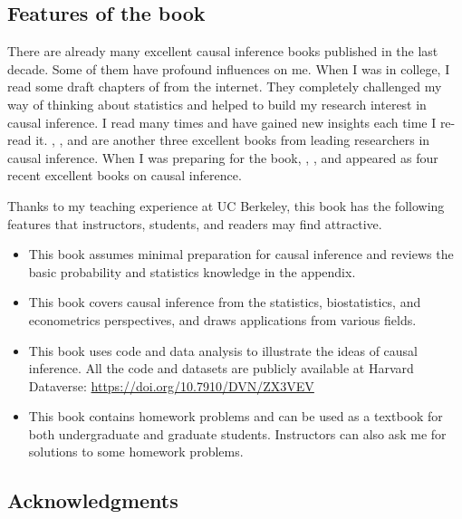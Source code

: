  


\subsection*{Features of the book}


There are already many excellent causal inference books published in the last decade.  Some of them have profound influences on me. 
When I was in college, I read some draft chapters of \citet{imbens2015causal} from the internet. They completely challenged my way of thinking about statistics and helped to build my research interest in causal inference.  
I read \citet{angrist2008mostly} many times and have gained new insights each time I re-read it. 
\citet{rosenbaum2002design}, \citet{morgan2015counterfactuals}, and \citet{hernan2020causal} are another three excellent books from leading researchers in causal inference.
When I was preparing for the book,  \citet{cunningham2021causal}, \citet{huntington2022effect},  \citet{brumback2022fundamentals} and \citet{huber2023causal} appeared as four recent excellent books on causal inference. 


Thanks to my teaching experience at UC Berkeley, this book has the following features that instructors, students, and readers may find attractive. 
\begin{itemize}
\item
This book assumes minimal preparation for causal inference and reviews the basic probability and statistics knowledge in the appendix.

\item
This book covers causal inference from the statistics,  biostatistics, and econometrics perspectives, and draws applications from various fields. 

\item
This book uses  code and data analysis to illustrate the ideas of causal inference. All the  code and datasets are publicly available at Harvard Dataverse: \url{https://doi.org/10.7910/DVN/ZX3VEV}

\item
This book contains homework problems and can be used as a textbook for both undergraduate and graduate students. Instructors can also ask me for solutions to some homework problems. 
\end{itemize}




\subsection*{Acknowledgments}



